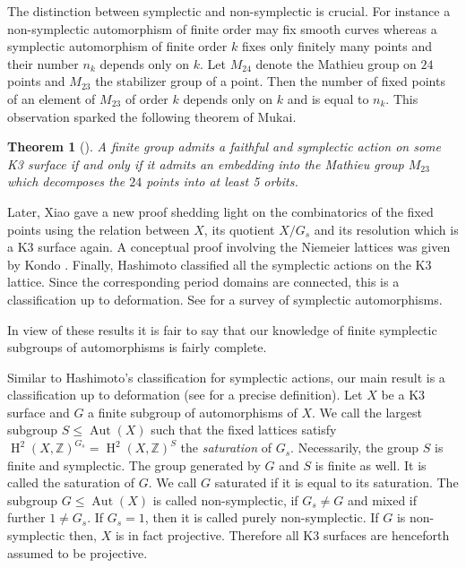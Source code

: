 \documentclass[a4paper]{amsart}
\theoremstyle{definition}
\theoremstyle{plain}
\newtheorem{theorem}[definition]{Theorem}
\DeclareMathOperator{\Aut}{Aut}
\DeclareMathOperator{\HH}{H}
\newcommand{\ZZ}{\mathbb{Z}}
\begin{document}
The distinction between symplectic and non-symplectic is crucial. For instance a non-symplectic automorphism of finite order may fix smooth curves whereas
a symplectic automorphism of finite order $k$ fixes only finitely many points and their number $n_k$ depends only on $k$.
Let $M_{24}$ denote the Mathieu group on $24$ points and $M_{23}$ the stabilizer group of a point. Then the number of fixed points of an element of $M_{23}$ of order $k$ depends only on $k$ and is equal to $n_k$. This observation sparked the following theorem of Mukai.

\begin{theorem}[\cite{mukai1988}]
A finite group admits a faithful and symplectic action on some K3 surface if and only if it admits an embedding into the Mathieu group $M_{23}$ which decomposes the $24$ points into at least 5 orbits.
\end{theorem}

Later, Xiao \cite{Xiao} gave a new proof shedding light on the combinatorics of the fixed points using the relation between
$X$, its quotient $X/G_s$ and its resolution which is a K3 surface again.
A conceptual proof involving the Niemeier lattices was given by Kondo \cite{kondo1998}.
Finally, Hashimoto \cite{Hashimoto2012} classified all the symplectic actions on the K3 lattice. Since the corresponding period domains are connected, this is a classification up to deformation.
See \cite{kondo2018} for a survey of symplectic automorphisms.

In view of these results it is fair to say that our knowledge of finite symplectic subgroups of automorphisms is fairly complete.

%
%
%
%

Similar to Hashimoto's classification for symplectic actions, our main result is a classification up to deformation (see  for a precise definition).
Let $X$ be a K3 surface and $G$ a finite subgroup of  automorphisms of $X$.
We call the largest subgroup $S \leq \Aut(X)$ such that the fixed lattices satisfy $\HH^2(X,\ZZ)^{G_s}=\HH^2(X,\ZZ)^{S}$ the \emph{saturation} of $G_s$.
Necessarily, the group $S$ is finite and symplectic. The group generated by $G$ and $S$ is finite as well. It is called the saturation of $G$.
We call $G$ saturated if it is equal to its saturation.
The subgroup $G \leq \Aut(X)$ is called non-symplectic, if $G_s \neq G$ and mixed if further $1\neq G_s$. If $G_s=1$, then it is called purely non-symplectic. If $G$ is non-symplectic then, $X$ is in fact projective. Therefore all K3 surfaces are henceforth assumed to be projective.
\end{document}
